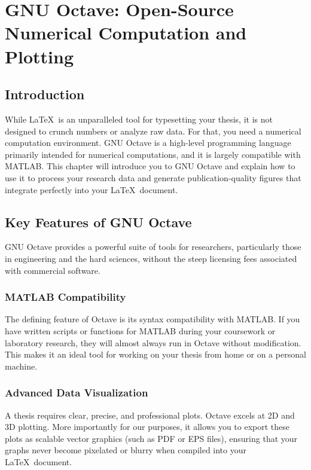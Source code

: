 \chapter{GNU Octave: Open-Source Numerical Computation and Plotting}\label{ch:octave}
	\section{Introduction}\label{sec:OctaveIntroduction}
		While \LaTeX\ is an unparalleled tool for typesetting your thesis, it is not designed to crunch numbers or analyze raw data. 
		For that, you need a numerical computation environment. 
		GNU Octave is a high-level programming language primarily intended for numerical computations, and it is largely compatible with MATLAB. 
		This chapter will introduce you to GNU Octave and explain how to use it to process your research data and generate publication-quality figures that integrate perfectly into your \LaTeX\ document.

	\section{Key Features of GNU Octave}
		GNU Octave provides a powerful suite of tools for researchers, particularly those in engineering and the hard sciences, without the steep licensing fees associated with commercial software.

		\subsection{MATLAB Compatibility}
			The defining feature of Octave is its syntax compatibility with MATLAB. 
			If you have written scripts or functions for MATLAB during your coursework or laboratory research, they will almost always run in Octave without modification. 
			This makes it an ideal tool for working on your thesis from home or on a personal machine.

		\subsection{Advanced Data Visualization}
			A thesis requires clear, precise, and professional plots.
			 Octave excels at 2D and 3D plotting. 
			 More importantly for our purposes, it allows you to export these plots as scalable vector graphics (such as PDF or EPS files), ensuring that your graphs never become pixelated or blurry when compiled into your \LaTeX\ document.

